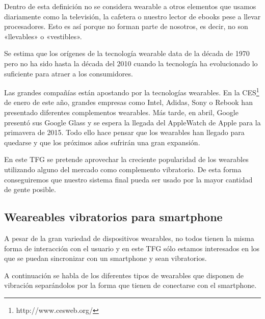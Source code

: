 Dentro de esta definición no se considera wearable a otros elementos que usamos diariamente como la
televisión, la cafetera o nuestro lector de ebooks pese a llevar procesadores. Esto es así porque no
forman parte de nosotros, es decir, no son «llevables» o «vestibles».

Se estima que los orígenes de la tecnología wearable data de la década de 1970 pero no ha sido hasta
la década del 2010 cuando la tecnología ha evolucionado lo suficiente para atraer a los
consumidores. 

Las grandes compañías están apostando por la tecnologías wearables.  En la
\acf{CES}\footnote{http://www.cesweb.org/} de enero de este año, grandes empresas como Intel,
Adidas, Sony o Rebook han presentado diferentes complementos wearables. Más tarde, en abril, Google
presentó sus Google Glass y se espera la llegada del AppleWatch de Apple para la primavera de
2015. Todo ello hace pensar que los wearables han llegado para quedarse y que los próximos años
sufrirán una gran expansión.

En este \acs{TFG} se pretende aprovechar la creciente popularidad de los wearables utilizando alguno
del mercado como complemento vibratorio. De esta forma conseguiremos que nuestro sistema final pueda
ser usado por la mayor cantidad de gente posible.

\subsection{Weareables vibratorios para smartphone}

A pesar de la gran variedad de dispositivos wearables, no todos tienen la misma forma de interacción
con el usuario y en este \acs{TFG} sólo estamos interesados en los que se puedan sincronizar con un
smartphone y sean vibratorios.

A continuación se habla de los diferentes tipos de wearables que disponen de vibración separándolos
por la forma que tienen de conectarse con el smartphone.

